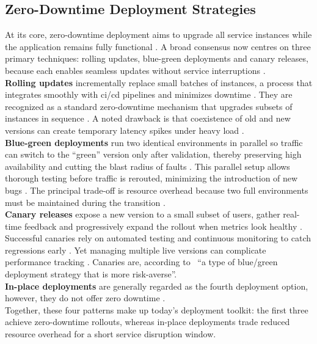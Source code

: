 \documentclass[11pt, a4paper, oneside, listof=totoc]{scrartcl}
\begin{document}
        \subsection{Zero-Downtime Deployment Strategies}\label{subsec:zeroDowntime}
            At its core, zero-downtime deployment aims to upgrade all service instances while the
            application remains fully functional \parencite[n.\,p., inside front matter]{davis2019}.
            A broad consensus now centres on three primary techniques: rolling updates, blue-green
            deployments and canary releases, because each enables seamless updates without service
            interruptions \parencite[p.~1]{rakshit2024}.
            \\
            \textbf{Rolling updates} incrementally replace small batches of instances, a process
            that integrates smoothly with \gls{ci}/\gls{cd} pipelines and minimizes downtime
            \parencite[p.~1]{rakshit2024}.
            They are recognized as a standard zero-downtime mechanism that upgrades subsets of
            instances in sequence \parencite[n.\,p., inside front matter]{davis2019}.
            A noted drawback is that coexistence of old and new versions can create temporary
            latency spikes under heavy load \parencite[p.~1]{rakshit2024}.
            \\
            \textbf{Blue-green deployments} run two identical environments in parallel so traffic
            can switch to the \enquote{green} version only after validation, thereby preserving high
            availability and cutting the blast radius of faults \parencite[p.~1]{rakshit2024}.
            This parallel setup allows thorough testing before traffic is rerouted, minimizing the
            introduction of new bugs \parencite[p.~1]{rakshit2024}.
            The principal trade-off is resource overhead because two full environments must be
            maintained during the transition \parencite[p.~1]{rakshit2024}.
            \\
            \textbf{Canary releases} expose a new version to a small subset of users, gather
            real-time feedback and progressively expand the rollout when metrics look healthy
            \parencite[pp.~1--2]{rakshit2024}.
            Successful canaries rely on automated testing and continuous monitoring to catch
            regressions early \parencite[p.~2]{rakshit2024}.
            Yet managing multiple live versions can complicate performance tracking
            \parencite[p.~2]{rakshit2024}.
            Canaries are, according to~\cite[pp.~33--34]{awsOverviewDeploymentOptions}
            \enquote{a type of blue/green deployment strategy that is more risk-averse}.
            \\
            \textbf{In-place deployments} are generally regarded as the fourth deployment option,
            however, they do not offer zero downtime
            \parencite[p.~34]{awsOverviewDeploymentOptions}.
            \\
            Together, these four patterns make up today's deployment toolkit: the first three
            achieve zero-downtime rollouts, whereas in-place deployments trade reduced resource
            overhead for a short service disruption window.
\end{document}
